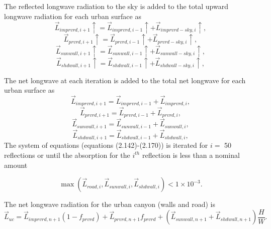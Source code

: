 \documentclass[12pt,authoryear]{elsarticle}
\numberwithin{equation}{section} %
\begin{document}
The reflected longwave radiation to the sky is added to the total upward longwave
radiation for each urban surface as
\begin{equation}
\overrightarrow{L}_{imprvrd,i+1}\uparrow=\overrightarrow{L}_{imprvrd,i-1}\uparrow+\overrightarrow{L}_{imprvrd-sky,i}\uparrow,
\end{equation}
\begin{equation}
\overrightarrow{L}_{prvrd,i+1}\uparrow=\overrightarrow{L}_{prvrd,i-1}\uparrow+\overrightarrow{L}_{prvrd-sky,i}\uparrow,
\end{equation}
\begin{equation}
\overrightarrow{L}_{sunwall,i+1}\uparrow=\overrightarrow{L}_{sunwall,i-1}\uparrow+\overrightarrow{L}_{sunwall-sky,i}\uparrow,
\end{equation}
\begin{equation}
\overrightarrow{L}_{shdwall,i+1}\uparrow=\overrightarrow{L}_{shdwall,i-1}\uparrow+\overrightarrow{L}_{shdwall-sky,i}\uparrow,
\end{equation}

The net longwave at each iteration is added to the total net longwave for each urban surface as
\begin{equation}
\overrightarrow{L}_{imprvrd,i+1}=\overrightarrow{L}_{imprvrd,i-1}+\overrightarrow{L}_{imprvrd,i},
\end{equation}
\begin{equation}
\overrightarrow{L}_{prvrd,i+1}=\overrightarrow{L}_{prvrd,i-1}+\overrightarrow{L}_{prvrd,i},
\end{equation}
\begin{equation}
\overrightarrow{L}_{sunwall,i+1}=\overrightarrow{L}_{sunwall,i-1}+\overrightarrow{L}_{sunwall,i},
\end{equation}
\begin{equation}
\overrightarrow{L}_{shdwall,i+1}=\overrightarrow{L}_{shdwall,i-1}+\overrightarrow{L}_{shdwall,i},
\end{equation}
The system of equations (equations (2.142)-(2.170)) is iterated for $i =$ 50 reflections or until the absorption for the $i^{th}$ reflection is less than a nominal amount

\begin{equation}
\max(\overrightarrow{L}_{road,i},\overrightarrow{L}_{sunwall,i},\overrightarrow{L}_{shdwall,i}) < 1\times10^{-3}.
\end{equation}

The net longwave radiation for the urban canyon (walls and road) is
\begin{equation}
\overrightarrow{L}_{uc}=\overrightarrow{L}_{imprvrd,n+1}(1-f_{prvrd})+\overrightarrow{L}_{prvrd,n+1}f_{prvrd}+(\overrightarrow{L}_{sunwall,n+1}+\overrightarrow{L}_{shdwall,n+1})\frac{H}{W}.
\end{equation}
\end{document}
